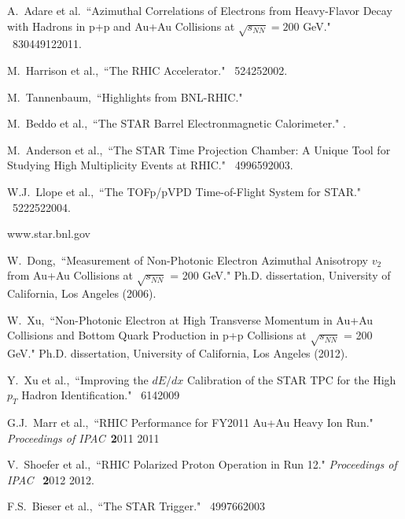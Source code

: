 \begin{thebibliography}{1000}
A.~Adare et al.~``Azimuthal Correlations of Electrons from Heavy-Flavor Decay with Hadrons in p+p and Au+Au Collisions at $\sqrt{s_{NN}} = 200$ GeV." \Journal{\PRC} {~83}{044912}{2011}.


M.~Harrison et al.,~``The RHIC Accelerator." \Journal{\ARNPS} {~52}{425}{2002}.

M.~Tannenbaum,~``Highlights from BNL-RHIC." 

M.~Beddo et al.,~``The STAR Barrel Electronmagnetic Calorimeter." .

M.~Anderson et al.,~``The STAR Time Projection Chamber: A Unique Tool for Studying High Multiplicity Events at RHIC." \Journal{\NIM } {~499}{659}{2003}.

W.J.~Llope et al.,~``The TOFp/pVPD Time-of-Flight System for STAR." \Journal{\NIM} {~522}{252}{2004}.

www.star.bnl.gov

W.~Dong,~``Measurement of Non-Photonic Electron Azimuthal Anisotropy $v_2$ from Au+Au Collisions at $\sqrt{s_{NN}}$ = 200 GeV." Ph.D. dissertation, University of California, Los Angeles (2006).

W.~Xu,~``Non-Photonic Electron at High Transverse Momentum in Au+Au Collisions and Bottom Quark Production in p+p Collisions at $\sqrt{s_{NN}}$ = 200 GeV." Ph.D. dissertation, University of California, Los Angeles (2012).

Y.~Xu et al.,~``Improving the $dE/dx$ Calibration of the STAR TPC for the High $p_T$ Hadron Identification." \Journal{\NIM} {~614}{}{2009}

G.J.~Marr et al.,~``RHIC Performance for FY2011 Au+Au Heavy Ion Run." \textit {Proceedings of IPAC}~{\textbf 2011} {2011}

V.~Shoefer et al.,~``RHIC Polarized Proton Operation in Run 12." \textit {Proceedings of IPAC}
~{\textbf 2012} {2012}.

F.S.~Bieser et al.,~``The STAR Trigger." \Journal{\NIM} {~499}{766}{2003}


\end{thebibliography}
